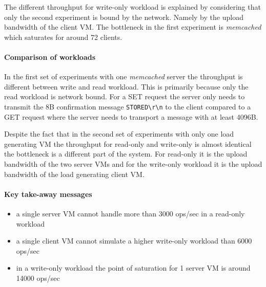 \documentclass[report.tex]{subfiles}
\begin{document}
The different throughput for write-only workload is explained by considering that only the second experiment is bound by the network. Namely by the upload bandwidth of the client VM. The bottleneck in the first experiment is \emph{memcached} which saturates for around 72 clients.

\paragraph{Comparison of workloads}
In the first set of experiments with one \emph{memcached} server the throughput is different between write and read workload. 
This is primarily because only the read workload is network bound. For a SET request the server only needs to transmit the 8B confirmation message \texttt{STORED\textbackslash r\textbackslash n} to the client compared to a GET request where the server needs to transport a message with at least 4096B. 

Despite the fact that in the second set of experiments with only one load generating VM the throughput for read-only and write-only is almost identical the bottleneck is a different part of the system. For read-only it is the upload bandwidth of the two server VMs and for the write-only workload it is the upload bandwidth of the load generating client VM.

\paragraph{Key take-away messages}
\begin{itemize}
	\vitemsep
	\item a single server VM cannot handle more than 3000 ops/sec in a read-only workload
	\item a single client VM cannot simulate a higher write-only workload than 6000 ops/sec
	\item in a write-only workload the point of saturation for 1 server VM is around 14000 ops/sec
\end{itemize}
\end{document}
